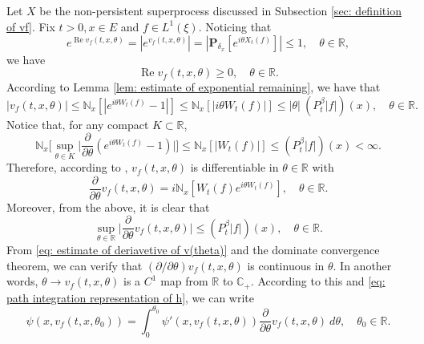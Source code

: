 \documentclass[12pt, a4paper]{amsart}
\theoremstyle{definition}
\numberwithin{equation}{section}
\begin{document}
\subsection{}
    Let $X$ be the non-persistent superprocess discussed in Subsection \ref{sec: definition of vf}. 
    Fix $t > 0,x\in E$ and $f\in L^1(\xi)$.
	Noticing that
\[
	e^{\operatorname{Re} v_f(t,x,\theta)} = |e^{v_f(t,x,\theta)}|
	= |\mathbf P_{\delta_x}[e^{i\theta X_t(f)}]| \leq 1,
	\quad \theta\in \mathbb R,
\]
    we have
\begin{equation}
\label{eq: v has positive real part}
	\operatorname{Re} v_f(t,x,\theta) \geq 0,\quad \theta \in \mathbb R.
\end{equation}
	According to Lemma \ref{lem: estimate of exponential remaining}, we have that
\begin{equation}
	|v_f(t,x,\theta)| \leq \mathbb N_x[|e^{i\theta W_t(f)} - 1|]
	\leq \mathbb N_x[|i\theta W_t(f)|]
	\leq |\theta| ~(P^\beta_t |f|)(x),
	\quad \theta \in \mathbb R.
\end{equation}
	Notice that, for any compact $K \subset \mathbb R$, 
\begin{equation}
\label{eq: estimate of deriavetive of v(theta)}
	\mathbb N_x\Big[\sup_{\theta \in K} \Big|\frac{\partial}{\partial \theta} (e^{i\theta W_t(f)} - 1) \Big|\Big]
	\leq \mathbb N_x[|W_t(f)|] \leq (P^\beta_t |f|)(x) < \infty.
\end{equation}
	Therefore, according to \cite[Theorem A.5.2.]{Durrett2010Probability},
	$v_f(t,x,\theta)$ is differentiable in $\theta \in \mathbb R$ with
\[
	\frac{\partial}{\partial \theta} v_f(t,x,\theta)
	= i\mathbb N_x[W_t(f)e^{i\theta W_t(f)}],
	\quad \theta \in \mathbb R.
\]
	Moreover, from the above, it is clear that
\begin{equation}
\label{eq: upper bounded for derivative of v(theta)}
	\sup_{\theta \in \mathbb R}\Big| \frac{\partial}{\partial \theta} v_f(t,x,\theta)\Big|\leq ( P^\beta_t |f|)(x),
    \quad \theta \in \mathbb R.
\end{equation}
    From \eqref{eq: estimate of deriavetive of v(theta)} and the dominate convergence theorem, we can verify that $(\partial/\partial \theta)v_f(t,x,\theta)$ is continuous in $\theta$.
    In another words, $\theta \to v_f(t,x,\theta)$ is a $C^1$ map from $\mathbb R$ to $\mathbb C_+$.
    According to this and \eqref{eq: path integration representation of h}, we can write
\begin{equation}
\label{eq: path integration representation of psi(v)}
    \psi(x,v_f(t,x,\theta_0)) = \int_0^{\theta_0} \psi'(x,v_f(t,x,\theta)) \frac{\partial}{\partial \theta} v_f(t,x,\theta)~d\theta,
    \quad \theta_0 \in \mathbb R.
\end{equation}
\end{document}
